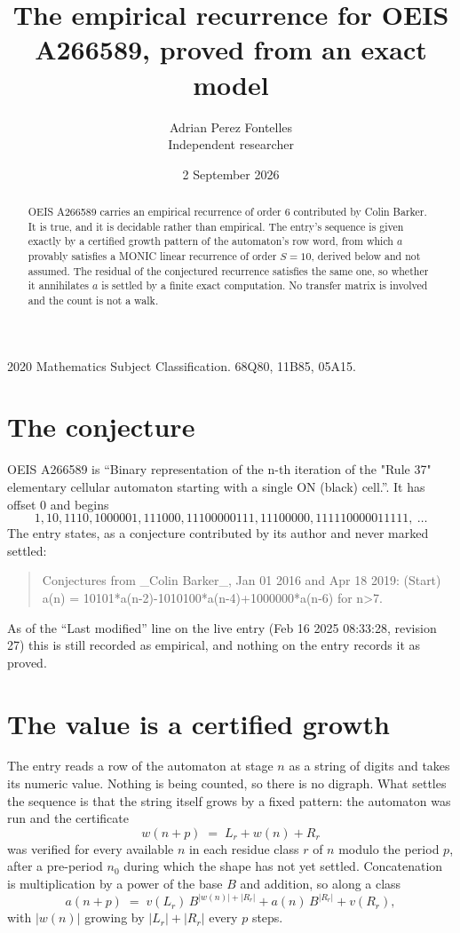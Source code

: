 \documentclass[11pt,a4paper]{article}
\title{The empirical recurrence for OEIS A266589, proved from an exact model}
\author{Adrian Perez Fontelles\\ \small Independent researcher}
\date{2 September 2026}
\theoremstyle{plain}
\theoremstyle{definition}
\begin{document}
\maketitle

\begin{abstract}
OEIS A266589 carries an empirical recurrence of order $6$ contributed by Colin Barker. It is true, and it is
decidable rather than empirical. The entry's sequence is given exactly by a certified growth pattern of the automaton's row word, from
which $a$ provably satisfies a MONIC linear recurrence of order $S=10$, derived below and not
assumed. The residual of the conjectured recurrence satisfies the same one, so whether it
annihilates $a$ is settled by a finite exact computation. No transfer matrix is involved and
the count is not a walk.
\end{abstract}

\noindent\small 2020 Mathematics Subject Classification. 68Q80, 11B85, 05A15.\normalsize

\section{The conjecture}

OEIS A266589 is ``Binary representation of the n-th iteration of the "Rule 37" elementary cellular automaton starting with a single ON (black) cell.''. It has offset $0$ and begins
\[
1, 10, 1110, 1000001, 111000, 11100000111, 11100000, 111110000011111,\ \dots
\]
The entry states, as a conjecture contributed by its author and never marked settled:
\begin{quote}
Conjectures from \_Colin Barker\_, Jan 01 2016 and Apr 18 2019: (Start) a(n) = 10101*a(n-2)-1010100*a(n-4)+1000000*a(n-6) for n>7.
\end{quote}
As of the ``Last modified'' line on the live entry (Feb 16 2025 08:33:28, revision 27)
this is still recorded as empirical, and nothing on the entry records it as proved.

\section{The value is a certified growth}

The entry reads a row of the automaton at stage $n$ as a string of digits and takes its
numeric value. Nothing is being counted, so there is no digraph. What settles the sequence is
that the string itself grows by a fixed pattern: the automaton was run and the certificate
\[
w(n+p)\;=\;L_r + w(n) + R_r
\]
was verified for every available $n$ in each residue class $r$ of $n$ modulo the period $p$,
after a pre-period $n_0$ during which the shape has not yet settled. Concatenation is
multiplication by a power of the base $B$ and addition, so along a class
\[
a(n+p)\;=\;v(L_r)\,B^{|w(n)|+|R_r|} + a(n)\,B^{|R_r|} + v(R_r),
\]
with $|w(n)|$ growing by $|L_r|+|R_r|$ every $p$ steps.
\end{document}
